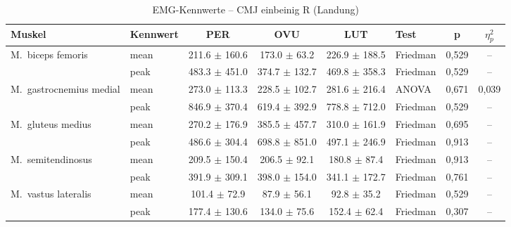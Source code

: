 \begin{table}[H]
  \centering
  \caption{EMG-Kennwerte – CMJ einbeinig R (Landung)}
  \label{tab:CMJ_einbeinig_R_Landung}
  \small
  \begin{tabular}{l l c c c l c c}
    \hline
    \textbf{Muskel} & \textbf{Kennwert} & \textbf{PER} & \textbf{OVU} & \textbf{LUT} & \textbf{Test} & \textbf{p} & \textbf{$\eta^2_p$} \\
    \hline
    M.~biceps femoris & mean & 211.6 $\pm$ 160.6 & 173.0 $\pm$ 63.2 & 226.9 $\pm$ 188.5 & Friedman & 0{,}529 & -- \\
     & peak & 483.3 $\pm$ 451.0 & 374.7 $\pm$ 132.7 & 469.8 $\pm$ 358.3 & Friedman & 0{,}529 & -- \\
    \hline
    M.~gastrocnemius medial & mean & 273.0 $\pm$ 113.3 & 228.5 $\pm$ 102.7 & 281.6 $\pm$ 216.4 & ANOVA & 0{,}671 & 0{,}039 \\
     & peak & 846.9 $\pm$ 370.4 & 619.4 $\pm$ 392.9 & 778.8 $\pm$ 712.0 & Friedman & 0{,}529 & -- \\
    \hline
    M.~gluteus medius & mean & 270.2 $\pm$ 176.9 & 385.5 $\pm$ 457.7 & 310.0 $\pm$ 161.9 & Friedman & 0{,}695 & -- \\
     & peak & 486.6 $\pm$ 304.4 & 698.8 $\pm$ 851.0 & 497.1 $\pm$ 246.9 & Friedman & 0{,}913 & -- \\
    \hline
    M.~semitendinosus & mean & 209.5 $\pm$ 150.4 & 206.5 $\pm$ 92.1 & 180.8 $\pm$ 87.4 & Friedman & 0{,}913 & -- \\
     & peak & 391.9 $\pm$ 309.1 & 398.0 $\pm$ 154.0 & 341.1 $\pm$ 172.7 & Friedman & 0{,}761 & -- \\
    \hline
    M.~vastus lateralis & mean & 101.4 $\pm$ 72.9 & 87.9 $\pm$ 56.1 & 92.8 $\pm$ 35.2 & Friedman & 0{,}529 & -- \\
     & peak & 177.4 $\pm$ 130.6 & 134.0 $\pm$ 75.6 & 152.4 $\pm$ 62.4 & Friedman & 0{,}307 & -- \\
    \hline
  \end{tabular}
\end{table}

